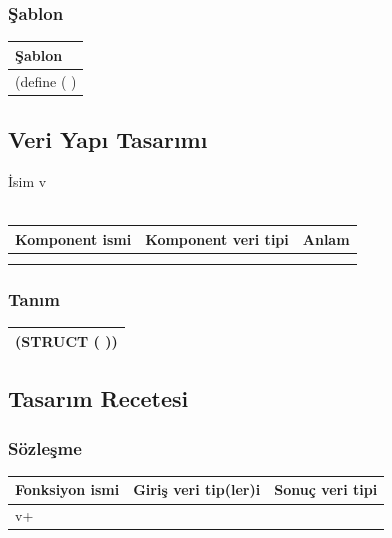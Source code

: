 \documentclass[12pt, a4paper]{article}
\newcommand\fillin[1][3cm]{\makebox[#1]{\dotfill}}
\begin{document}
\subsubsection*{Şablon}
\begin{tabular}{| p{17cm} |  }
\hline			
Şablon\\
\hline
\vspace{0,5cm}
\vspace{0,2cm}
(define (\fillin[2cm] \hspace{1cm}  \fillin[8cm] ) \\[30ex]
\hline  
\end{tabular}



\newpage
\subsection*{Veri Yapı Tasarımı}
İsim v\\
\vspace{0.5cm}\\
\begin{tabular}{| p{4cm} | p{4cm} | p{8cm} |  }
\hline			
Komponent ismi&Komponent veri tipi&Anlam\\
\hline
& & \\[10ex]
\hline  
& & \\[10ex]
\hline  
\end{tabular}

\subsubsection*{Tanım}
\begin{tabular}{| p{17cm} |  }
\hline			
\vspace{0.5cm}
(STRUCT \fillin[3cm] (\fillin[10cm] ))\\[10ex]
\hline
\end{tabular}






\newpage
\subsection*{Tasarım Recetesi}
\subsubsection*{Sözleşme}
\begin{tabular}{| p{4cm} | p{8cm} | p{4cm} |  }
\hline			
Fonksiyon ismi&Giriş veri tip(ler)i&Sonuç veri tipi\\
\hline
v+& & \\[10ex]
\hline  
\end{tabular}
\end{document}
